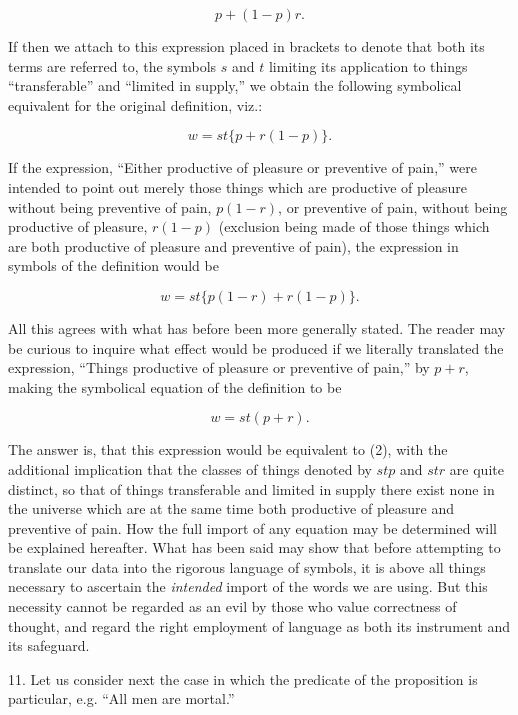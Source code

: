 \documentclass[oneside]{book}
\begin{document}
$$p+(1-p)r.$$

If then we attach to this expression placed in brackets to denote
that both its terms are referred to, the symbols $s$ and $t$ limiting
its application to things ``transferable'' and ``limited in supply,''
we obtain the following symbolical equivalent for the original
definition, viz.:

\begin{equation}
w = st\{p + r(1-p)\}.
\end{equation}

If the expression, ``Either productive of pleasure or preventive of
pain,'' were intended to point out merely those things which are
productive of pleasure without being preventive of pain, $p (1 - r)$,
or preventive of pain, without being productive of pleasure,
$r (1 - p)$ (exclusion being made of those things which are both
productive of pleasure and preventive of pain), the expression in
symbols of the definition would be

\begin{equation}
w = st\{p(1-r) + r(1-p)\}.
\end{equation}

All this agrees with what has before been more generally stated.
The reader may be curious to inquire what effect would be
produced if we literally translated the expression, ``Things productive
of pleasure or preventive of pain,'' by $p + r$, making the
symbolical equation of the definition to be

\begin{equation}
w = st(p + r).
\end{equation}

The answer is, that this expression would be equivalent to (2),
with the additional implication that the classes of things denoted
by $stp$ and $str$ are quite distinct, so that of things transferable
and limited in supply there exist none in the universe which are
at the same time both productive of pleasure and preventive of
pain. How the full import of any equation may be determined
will be explained hereafter. What has been said may show that before
attempting to translate our data into the rigorous language
of symbols, it is above all things necessary to ascertain the \textit{intended}
import of the words we are using. But this necessity
cannot be regarded as an evil by those who value correctness of
thought, and regard the right employment of language as both
its instrument and its safeguard.

11. Let us consider next the case in which the predicate of
the proposition is particular, e.g. ``All men are mortal.''
\end{document}

